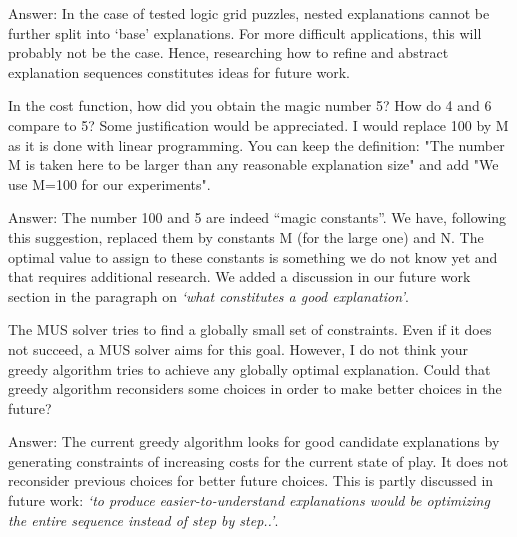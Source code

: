 \documentclass{article}
\newcommand\comment[1]{\marginpar{\tiny #1}}
\renewcommand\comment[1]{#1}
\newcommand{\emilio}[1]{{\comment{Answer: \color{red}#1}}}
\begin{document}
\emilio{In the case of tested logic grid puzzles, nested explanations cannot be further split into `base' explanations. For more difficult applications, this will probably not be the case. Hence, researching how to refine and abstract explanation sequences constitutes ideas for future work.}

\begin{quoteit}
In the cost function, how did you obtain the magic number 5? How do 4 and 6 compare to 5? Some justification would be appreciated. 
I would replace 100 by M as it is done with linear programming. You can keep the definition: "The number M is taken here to be larger than any reasonable explanation size" and add "We use M=100 for our experiments".
\end{quoteit}

\emilio{
	The number 100 and 5 are indeed ``magic constants''. We have, following this suggestion, replaced them by constants M (for the large one) and N. The optimal value to assign to these constants is something we do not know yet and that requires additional research. We added a discussion in our future work section in the paragraph on \emph{`what constitutes a good explanation'}.
}

\begin{quoteit}
The MUS solver tries to find a globally small set of constraints. Even if it does not succeed, a MUS solver aims for this goal. However, I do not think your greedy algorithm tries to achieve any globally optimal explanation.
Could that greedy algorithm reconsiders some choices in order to make better choices in the future?
\end{quoteit}

\emilio{The current greedy algorithm looks for good candidate explanations by generating constraints of increasing costs for the current state of play. It does not reconsider previous choices for better future choices. This is partly discussed in future work: \emph{`to produce easier-to-understand explanations would be optimizing the entire sequence instead of step by step..'}.}
\end{document}
